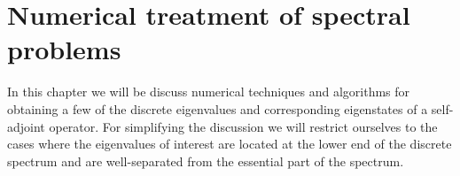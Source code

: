 \chapter{Numerical treatment of spectral problems}
\label{ch:numeigen}


\noindent
In this chapter we will be discuss numerical techniques
and algorithms for obtaining a few of the discrete
eigenvalues and corresponding eigenstates
of a self-adjoint operator.
For simplifying the discussion we will restrict ourselves
to the cases where the eigenvalues of interest
are located at the lower end of the discrete spectrum
and are well-separated from the essential part of the spectrum.



